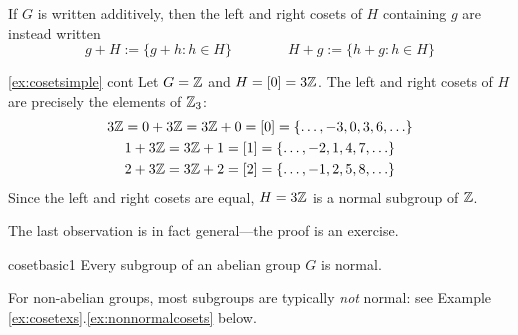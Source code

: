 If $G$ is written additively, then the left and right cosets of $H$ containing $g$ are instead written
\[
	g+H:=\{g+h:h\in H\}
	\qquad\qquad 
	H+g:=\{h+g:h\in H\}
\]

\begin{example*}{\ref{ex:cosetsimple} cont}{}
	Let $G=\mathbb{Z}$ and $H=[0]=3\mathbb{Z}$. The left and right cosets of $H$ are precisely the elements of $\mathbb{Z}_3$:
	\begin{gather*}
		3\mathbb{Z}=0+3\mathbb{Z}=3\mathbb{Z}+0=[0]=\{\ldots,-3,0,3,6,\ldots\}\\
		1+3\mathbb{Z}=3\mathbb{Z}+1=[1]=\{\ldots,-2,1,4,7,\ldots\}\\
		2+3\mathbb{Z}=3\mathbb{Z}+2=[2]=\{\ldots,-1,2,5,8,\ldots\}
	\end{gather*}
	Since the left and right cosets are equal, $H=3\mathbb{Z}$ is a normal subgroup of $\mathbb{Z}$.
\end{example*}

\goodbreak

The last observation is in fact general---the proof is an exercise.

\begin{lemm}{}{cosetbasic1}
	Every subgroup of an abelian group $G$ is normal.
\end{lemm}


For non-abelian groups, most subgroups are typically \emph{not} normal: see Example \ref*{ex:cosetexs}.\ref{ex:nonnormalcosets} below.



